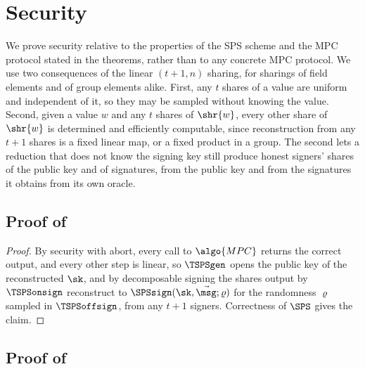 \section{Security}\label{sec:tsps-security}

We prove security relative to the properties of the SPS scheme and the MPC
protocol stated in the theorems, rather than to any concrete MPC protocol. We use
two consequences of the linear $(t+1, n)$ sharing, for sharings of field
elements and of group elements alike. First, any $t$ shares of a value are
uniform and independent of it, so they may be sampled without knowing the value.
Second, given a value $w$ and any $t$ shares of $\shr{w}$, every other share of
$\shr{w}$ is determined and efficiently computable, since reconstruction from any
$t+1$ shares is a fixed linear map, or a fixed product in a group. The second
lets a reduction that does not know the signing key still produce honest
signers' shares of the public key and of signatures, from the public key and
from the signatures it obtains from its own oracle.

\subsection{Proof of }

\begin{proof}

  By security with abort, every call to $\algo{MPC}$ returns the correct output,
and every other step is linear, so $\TSPSgen$ opens the public key of the
reconstructed $\sk$, and by decomposable signing the shares output by $\TSPSonsign$ reconstruct
to $\SPSsign(\sk, \vec{\msg}; \varrho)$ for the randomness $\varrho$ sampled in
$\TSPSoffsign$, from any $t+1$ signers. Correctness of $\SPS$ gives the claim.

\end{proof}

\subsection{Proof of }

